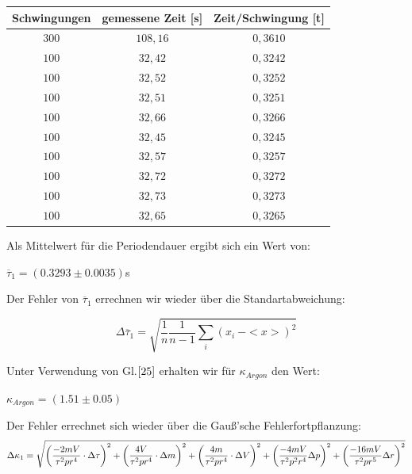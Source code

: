 \documentclass{article}
\begin{document}
{{\begin{center}
\begin{tabular}{c|c|c}
Schwingungen & gemessene Zeit [s]& Zeit/Schwingung [t]\\
\hline 
\(300\)	& \(108,16\)& \(0,3610\)\\
\(100\)	& \(32,42\)	& \(0,3242\)\\
\(100\)	& \(32,52\)	& \(0,3252\)\\
\(100\)	& \(32,51\)	& \(0,3251\)\\
\(100\)	& \(32,66\)	& \(0,3266\)\\
\(100\)	& \(32,45\)	& \(0,3245\)\\
\(100\)	& \(32,57\)	& \(0,3257\)\\
\(100\)	& \(32,72\)	& \(0,3272\)\\
\(100\)	& \(32,73\)	& \(0,3273\)\\
\(100\)	& \(32,65\)	& \(0,3265\)\\
\end{tabular}
\end{center}

\vspace{1cm}

Als Mittelwert für die Periodendauer ergibt sich ein Wert von:
\begin{center}
\(\overline{\tau}_{1} = (0.3293 \pm 0.0035)\)s
\end{center}

Der Fehler von \(\overline{\tau}_{1}\) errechnen wir wieder über die Standartabweichung:

\begin{equation}
\Delta \overline{\tau}_{1} = \sqrt{\frac{1}{n} \frac{1}{n-1}\sum\limits_{i}(x_i \ - <x>)^2}
\end{equation}

Unter Verwendung von Gl.\(\eqref{25}\) erhalten wir für \(\kappa_{Argon}\) den Wert:
\begin{center}
\(\kappa_{Argon} = (1.51 \pm 0.05)\)
\end{center}
Der Fehler errechnet sich wieder über die Gauß'sche Fehlerfortpflanzung:
\begin{equation}
\notag
\Delta \kappa_1 =\sqrt{\left( \frac{ -2mV}{ \tau^2 p r^4}\cdot \Delta \tau\right)^2 + \left( \frac{ 4V}{\tau^2 p r^4}\cdot \Delta m \right)^2+\left( \frac{4m }{\tau^2 p r^4}\cdot\Delta V \right)^2+\left( \frac{-4mV}{\tau^2 p^2 r^4}\Delta p \right)^2+\left( \frac{-16mV}{\tau^2 p r^5}\Delta r \right)^2}
\end{equation}

}}
\end{document}
